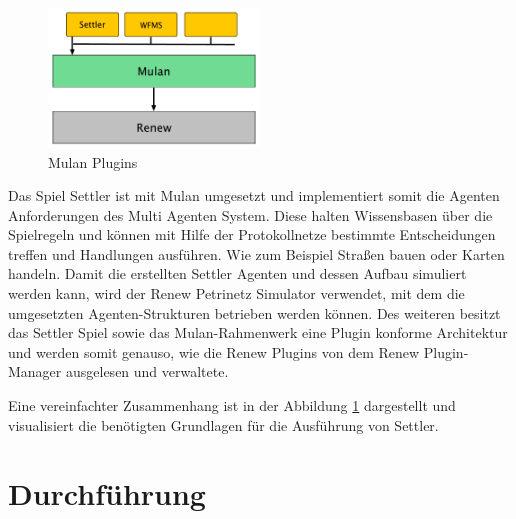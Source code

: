 	\begin{figure}[h!]
	  \centering
	  \includegraphics[width=0.5\textwidth]{material/images/settler-mulan-renew.pdf}
	  \caption{Mulan Plugins}
	  \label{fig:mulan_plugin}
	\end{figure}

	Das Spiel Settler ist mit Mulan umgesetzt und implementiert somit die Agenten Anforderungen des Multi Agenten System. Diese halten Wissensbasen über die Spielregeln und können mit Hilfe der Protokollnetze bestimmte Entscheidungen treffen und Handlungen ausführen. Wie zum Beispiel Straßen bauen oder Karten handeln.\newline
	Damit die erstellten Settler Agenten und dessen Aufbau simuliert werden kann, wird der Renew Petrinetz Simulator verwendet, mit dem die umgesetzten Agenten-Strukturen betrieben werden können.\newline
	Des weiteren besitzt das Settler Spiel sowie das Mulan-Rahmenwerk eine Plugin konforme Architektur und werden somit genauso, wie die Renew Plugins von dem Renew Plugin-Manager ausgelesen und verwaltete.\bigbreak

	Eine vereinfachter Zusammenhang ist in der Abbildung \ref{fig:mulan_plugin} dargestellt und visualisiert die benötigten Grundlagen für die Ausführung von Settler.

\section{Durchführung}
